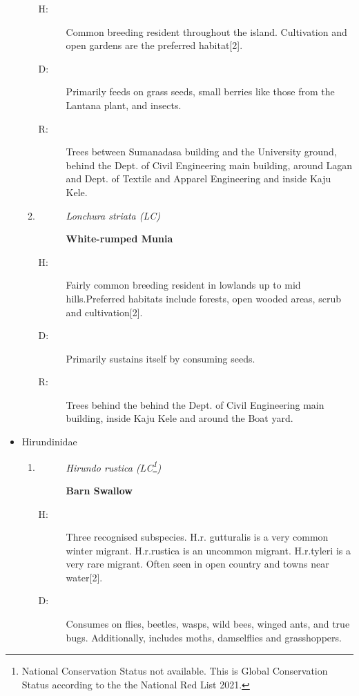\begin{itemize}
\begin{enumerate}
\begin{description}%
\item[H: ]%
Common breeding resident throughout the island. Cultivation and open gardens are the preferred habitat{[}2{]}.%
\item[D: ]%
Primarily feeds on grass seeds, small berries like those from the Lantana plant, and insects.%
\item[R: ]%
Trees between Sumanadasa building and the University ground, behind the Dept. of Civil Engineering main building, around Lagan and Dept. of Textile and Apparel Engineering and inside Kaju Kele.%
\end{description}%
\item%
\begin{description}%
\item[]%
\textit{Lonchura striata (LC)}%
\item[]%
\textbf{White{-}rumped Munia}%
\end{description}%
\begin{description}%
\item[H: ]%
Fairly common breeding resident in lowlands up to mid hills.Preferred habitats include forests, open wooded areas, scrub and cultivation{[}2{]}.%
\item[D: ]%
Primarily sustains itself by consuming seeds.%
\item[R: ]%
Trees behind the behind the Dept. of Civil Engineering main building, inside Kaju Kele and around the Boat yard.%
\end{description}%
\end{enumerate}%
\item%
Hirundinidae%
\begin{enumerate}%
\item%
\begin{description}%
\item[]%
\textit{Hirundo rustica (LC\footnote{National Conservation Status not available. This is Global Conservation Status according to the the National Red List 2021.})}%
\item[]%
\textbf{Barn Swallow}%
\end{description}%
\begin{description}%
\item[H: ]%
Three recognised subspecies. H.r. gutturalis is a very common winter migrant. H.r.rustica is an uncommon migrant. H.r.tyleri is a very rare migrant. Often seen in open country and towns near water{[}2{]}.%
\item[D: ]%
Consumes on flies, beetles, wasps, wild bees, winged ants, and true bugs. Additionally, includes moths, damselflies and grasshoppers.%

\end{description}
\end{enumerate}
\end{itemize}
